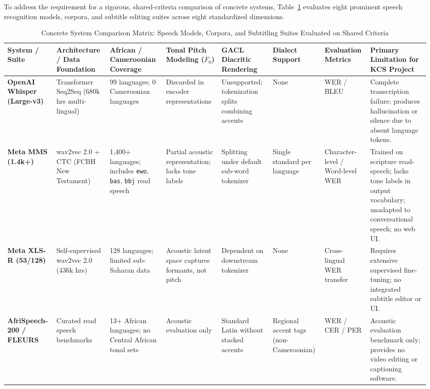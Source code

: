 \documentclass[a4paper,11pt]{article}
\begin{document}
To address the requirement for a rigorous, shared-criteria comparison of concrete systems, Table~\ref{tab:concrete_systems} evaluates eight prominent speech recognition models, corpora, and subtitle editing suites across eight standardized dimensions.

\begin{table}[t]
\centering
\scriptsize
\setlength{\tabcolsep}{3.2pt}
\caption{Concrete System Comparison Matrix: Speech Models, Corpora, and Subtitling Suites Evaluated on Shared Criteria}
\label{tab:concrete_systems}
\begin{tabular}{p{2.0cm} p{2.2cm} p{2.2cm} p{1.5cm} p{1.8cm} p{1.5cm} p{1.7cm} >{\raggedright\arraybackslash}p{3.2cm}}
\toprule
\textbf{System / Suite} & \textbf{Architecture / Data Foundation} & \textbf{African / Cameroonian Coverage} & \textbf{Tonal Pitch Modeling ($F_0$)} & \textbf{GACL Diacritic Rendering} & \textbf{Dialect Support} & \textbf{Evaluation Metrics} & \textbf{Primary Limitation for KCS Project} \\
\midrule
\textbf{OpenAI Whisper (Large-v3)}~\cite{radford2023robust} & Transformer Seq2Seq (680k hrs multi-lingual) & 99 languages; 0 Cameroonian languages & Discarded in encoder representations & Unsupported; tokenization splits combining accents & None & WER / BLEU & Complete transcription failure; produces hallucination or silence due to absent language tokens. \\
\addlinespace
\textbf{Meta MMS (1.4k+)}~\cite{pratap2024scaling} & wav2vec 2.0 + CTC (FCBH New Testament) & 1,400+ languages; includes \texttt{ewo}, \texttt{bas}, \texttt{bbj} read speech & Partial acoustic representation; lacks tone labels & Splitting under default sub-word tokenizer & Single standard per language & Character-level / Word-level WER & Trained on scripture read-speech; lacks tone labels in output vocabulary; unadapted to conversational speech; no web UI. \\
\addlinespace
\textbf{Meta XLS-R (53/128)}~\cite{babu2022xlsr} & Self-supervised wav2vec 2.0 (436k hrs) & 128 languages; limited sub-Saharan data & Acoustic latent space captures formants, not pitch & Dependent on downstream tokenizer & None & Cross-lingual WER transfer & Requires extensive supervised fine-tuning; no integrated subtitle editor or UI. \\
\addlinespace
\textbf{AfriSpeech-200 / FLEURS}~\cite{olatunji2023afrispeech, conneau2023fleurs} & Curated read speech benchmarks & 13+ African languages; no Central African tonal sets & Acoustic evaluation only & Standard Latin without stacked accents & Regional accent tags (non-Cameroonian) & WER / CER / PER & Acoustic evaluation benchmark only; provides no video editing or captioning software. \\

\end{tabular}
\end{table}
\end{document}
